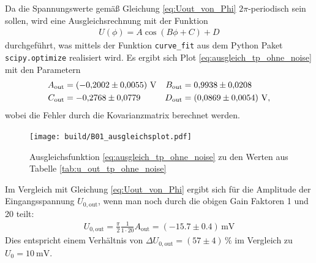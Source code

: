 \noindent
Da die Spannungswerte gemäß Gleichung \eqref{eq:Uout_von_Phi} $2 \pi$-periodisch sein sollen, wird eine Ausgleichsrechnung mit der Funktion 
\begin{align}
    \label{eq:ausgleich_tp_ohne_noise}
    U(\phi) = A \cos{\left(B \phi + C\right)} + D 
\end{align}
durchgeführt, was mittels der Funktion \texttt{curve\_fit} aus dem Python \cite{python} Paket \texttt{scipy.optimize} \cite[]{scipy} realisiert wird.
Es ergibt sich Plot \ref{eq:ausgleich_tp_ohne_noise} mit den Parametern
\begin{align*}
    A_\text{out} &= \left(\num[]{-0.2002} \pm \num[]{0.0055}\right) \, \unit{\volt} & B_\text{out} &=  \num[]{0.9938} \pm \num[]{0.0208} \\
    C_\text{out} &= \num[]{-0.2768} \pm \num[]{0.0779} & D_\text{out} &= \left(\num[]{0.0869} \pm \num[]{0.0054}\right) \, \unit[]{\volt},
\end{align*}
wobei die Fehler durch die Kovarianzmatrix berechnet werden.
%
\begin{figure}[H]
    \texttt{[image: build/B01\_ausgleichsplot.pdf]}
    \caption[]{Ausgleichsfunktion \eqref{eq:ausgleich_tp_ohne_noise} zu den Werten aus Tabelle \ref{tab:u_out_tp_ohne_noise}}
    \label{fig:ausgleichsplot1}
\end{figure}

\noindent
Im Vergleich mit Gleichung \eqref{eq:Uout_von_Phi} ergibt sich für die Amplitude der Eingangsspannung $U_{0,\text{out}}$,
wenn man noch durch die obigen Gain Faktoren 1 und 20 teilt:
\begin{align*}
    U_{0,\text{out}} = \frac{\pi}{2} \frac{1}{1 \cdot 20} A_\text{out} = \left(\num[]{-15.7} \pm \num[]{0.4}\right) \, \unit{\milli\volt}
\end{align*}
Dies entspricht einem Verhältnis von $\Delta U_{0,\text{out}} = \left(57 \pm 4\right) \, \%$
im Vergleich zu $U_0 = \qty[]{10}{\milli\volt}$.


